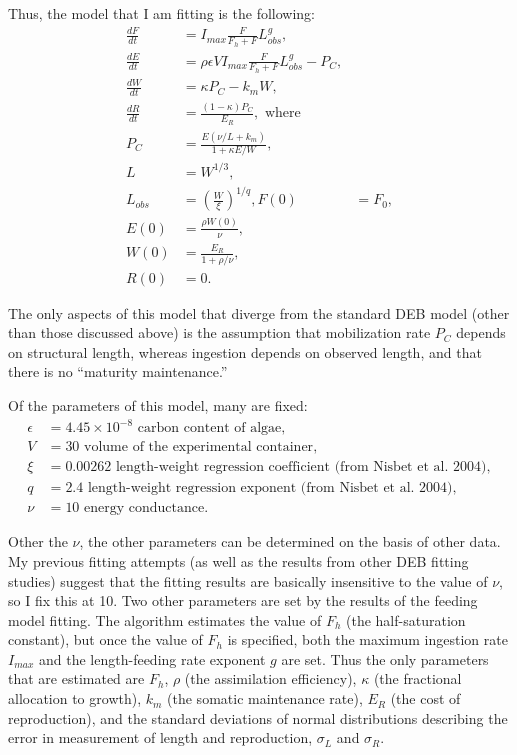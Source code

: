 \documentclass[12pt,reqno,final,pdftex]{amsart}\usepackage[]{graphicx}\usepackage[]{color}
\theoremstyle{plain}
\numberwithin{equation}{part}
\begin{document}
Thus, the model that I am fitting is the following:
\begin{align}
\frac{dF}{dt} &= I_{max} \frac{F}{F_h+F} L_{obs}^g, \\
\frac{dE}{dt} &= \rho \epsilon V I_{max} \frac{F}{F_h+F} L_{obs}^g - P_C, \\
\frac{dW}{dt} &= \kappa P_C - k_m W, \\
\frac{dR}{dt} &= \frac{(1-\kappa) P_C}{E_R}, \text{ where} \\
P_C &= \frac{E (\nu/L + k_m)}{1 + \kappa E/W}, \\
L &= W^{1/3}, \\
L_{obs} &= (\frac{W}{\xi})^{1/q},
F(0) &= F_0, \\
E(0) &= \frac{\rho W(0)}{\nu}, \\
W(0) &= \frac{E_R}{1+\rho/\nu}, \\
R(0) &= 0.
\end{align}

The only aspects of this model that diverge from the standard DEB model (other than those discussed above) is the assumption that mobilization rate $P_C$ depends on structural length, whereas ingestion depends on observed length, and that there is no ``maturity maintenance.''

Of the parameters of this model, many are fixed:
\begin{align}
\epsilon &= 4.45 \times 10^{-8} \text{ carbon content of algae}, \\
V &= 30 \text{ volume of the experimental container}, \\
\xi &= 0.00262 \text{ length-weight regression coefficient (from Nisbet et al. 2004)}, \\
q &= 2.4 \text{ length-weight regression exponent (from Nisbet et al. 2004)}, \\
\nu &= 10 \text{ energy conductance}.
\end{align}

Other the $\nu$, the other parameters can be determined on the basis of other data.
My previous fitting attempts (as well as the results from other DEB fitting studies) suggest that the fitting results are basically insensitive to the value of $\nu$, so I fix this at 10.
Two other parameters are set by the results of the feeding model fitting.
The algorithm estimates the value of $F_h$ (the half-saturation constant), but once the value of $F_h$ is specified, both the maximum ingestion rate $I_{max}$ and the length-feeding rate exponent $g$ are set.
Thus the only parameters that are estimated are $F_h$, $\rho$ (the assimilation efficiency), $\kappa$ (the fractional allocation to growth), $k_m$ (the somatic maintenance rate), $E_R$ (the cost of reproduction), and the standard deviations of normal distributions describing the error in measurement of length and reproduction, $\sigma_L$ and $\sigma_R$.
\end{document}
